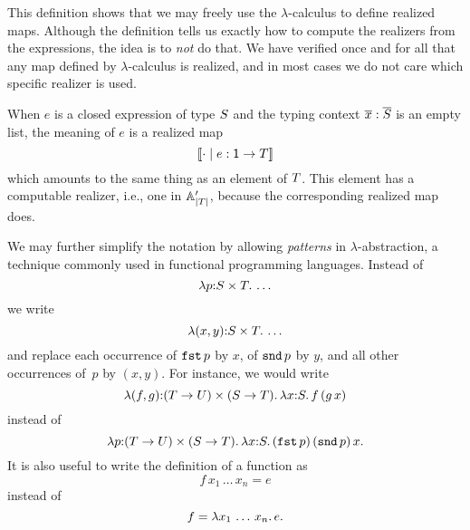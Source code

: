 %
This definition shows that we may freely use the $\lambda$-calculus to
define realized maps. Although the definition tells us exactly how to
compute the realizers from the expressions, the idea is to \emph{not}
do that. We have verified once and for all that any map defined by
$\lambda$-calculus is realized, and in most cases we do not care which
specific realizer is used.

When $e$ is a closed expression of type $S$ and the typing
context $\overline{x} : \overline{S}$ is an empty list, the
meaning of $e$ is a realized map
%
\begin{equation*}
  [\![{\cdot} \mid e : \mathsf{1} \to T]\!]
\end{equation*}
%
which amounts to the same thing as an element of $T$. This
element has a computable realizer, i.e., one in $\mathbb{A}'_{|T|}$,
because the corresponding realized map does.

We may further simplify the notation by allowing \emph{patterns} in
$\lambda$-abstraction, a technique commonly used in functional
programming languages. Instead of
%
\begin{equation*}
  \lambda p {:} S \times T .\,\ldots
\end{equation*}
%
we write
%
\begin{equation*}
  \lambda (x,y) {:} S \times T .\,\ldots
\end{equation*}
%
and replace each occurrence of $\mathtt{fst}\,p$ by $x$, of $\mathtt{snd}\,p$
by $y$, and all other occurrences of~$p$ by $(x,y)$. For instance, we
would write
%
\begin{equation*}
  \lambda (f,g) {:} (T \to U) \times (S \to T) .\,
    \lambda x {:} S .\,f\,(g\,x)
\end{equation*}
%
instead of
%
\begin{equation*}
  \lambda p {:} (T \to U) \times (S \to T) .\,
    \lambda x {:} S .\,(\mathtt{fst}\,p)\,(\mathtt{snd}\,p)\,x.
\end{equation*}
%
It is also useful to write the definition of a function as
%
\begin{equation*}
  f\,x_1\,\ldots\, x_n = e
\end{equation*}
%
instead of
%
\begin{equation*}
  f = \lambda x_1\,\ldots\, x_n .\,e.
\end{equation*}

